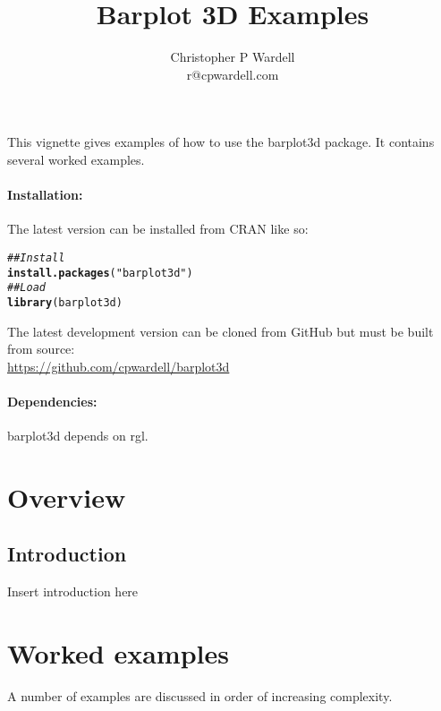 \documentclass{article}\usepackage[]{graphicx}\usepackage[]{color}
\makeatletter
\newcommand{\hlstr}[1]{\textcolor[rgb]{0.192,0.494,0.8}{#1}}%
\newcommand{\hlcom}[1]{\textcolor[rgb]{0.678,0.584,0.686}{\textit{#1}}}%
\newcommand{\hlstd}[1]{\textcolor[rgb]{0.345,0.345,0.345}{#1}}%
\newcommand{\hlkwd}[1]{\textcolor[rgb]{0.737,0.353,0.396}{\textbf{#1}}}%
\newenvironment{kframe}{%
 \def\at@end@of@kframe{}%
 \ifinner\ifhmode%
  \def\at@end@of@kframe{\end{minipage}}%
  \begin{minipage}{\columnwidth}%
 \fi\fi%
 \def\FrameCommand##1{\hskip\@totalleftmargin \hskip-\fboxsep
 \colorbox{shadecolor}{##1}\hskip-\fboxsep
     \hskip-\linewidth \hskip-\@totalleftmargin \hskip\columnwidth}%
 \MakeFramed {\advance\hsize-\width
   \@totalleftmargin\z@ \linewidth\hsize
   \@setminipage}}%
 {\par\unskip\endMakeFramed%
 \at@end@of@kframe}
\newenvironment{knitrout}{}{} %
\makeatother
\begin{document}
\title{Barplot 3D Examples}
\author{
  Christopher P Wardell\\
  r@cpwardell.com
}
\maketitle

This vignette gives examples of how to use the barplot3d package.  It contains several worked examples.

\paragraph{Installation:} The latest version can be installed from CRAN like so:
 
\begin{knitrout}
\color{fgcolor}\begin{kframe}
\begin{alltt}
\hlcom{## Install}
\hlkwd{install.packages}\hlstd{(}\hlstr{"barplot3d"}\hlstd{)}
\hlcom{## Load}
\hlkwd{library}\hlstd{(barplot3d)}
\end{alltt}
\end{kframe}
\end{knitrout}

\noindent The latest development version can be cloned from GitHub but must be built from source:\\

\noindent \url{https://github.com/cpwardell/barplot3d}

\paragraph{Dependencies:} barplot3d depends on rgl\cite{rgl}.

\pagebreak
\tableofcontents
\pagebreak

\section{Overview}
\subsection{Introduction}
Insert introduction here


\section{Worked examples}
A number of examples are discussed in order of increasing complexity.
\end{document}
